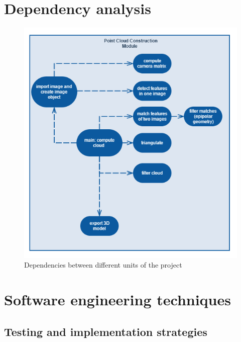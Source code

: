 \documentclass[12pt,a4paper,twoside,openright]{report}
\begin{document}
\section{Dependency analysis}
\begin{figure}
\centerline{\includegraphics[scale=0.75]{figs/dependencies.png}}
\caption{Dependencies between different units of the project}
\end{figure}

\section{Software engineering techniques}
\subsection{Testing and implementation strategies}
\end{document}
